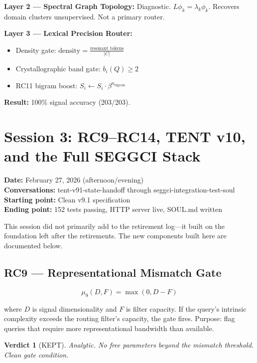 \documentclass[11pt]{article}
\newtheorem{verdict}{Verdict}
\begin{document}
\textbf{Layer 2 --- Spectral Graph Topology:} Diagnostic. $L\phi_k = \lambda_k\phi_k$. Recovers domain clusters unsupervised. Not a primary router.

\textbf{Layer 3 --- Lexical Precision Router:}
\begin{itemize}
  \item Density gate: $\text{density} = \frac{\text{resonant tokens}}{|C|}$
  \item Crystallographic band gate: $b_i(Q) \geq 2$
  \item RC11 bigram boost: $S_i \leftarrow S_i \cdot \beta^{n_{\text{bigram}}}$
\end{itemize}
\textbf{Result:} 100\% signal accuracy (203/203).

\section{Session 3: RC9--RC14, TENT v10, and the Full SEGGCI Stack}
\label{sec:session3}

\textbf{Date:} February 27, 2026 (afternoon/evening)\\
\textbf{Conversations:} tent-v91-state-handoff through seggci-integration-test-soul\\
\textbf{Starting point:} Clean v9.1 specification\\
\textbf{Ending point:} 152 tests passing, HTTP server live, SOUL.md written

This session did not primarily add to the retirement log---it built on the foundation left after the retirements. The new components built here are documented below.

\subsection{RC9 --- Representational Mismatch Gate}

\begin{equation}
  \mu_9(D, F) = \max(0, D - F)
\end{equation}

where $D$ is signal dimensionality and $F$ is filter capacity. If the query's intrinsic complexity exceeds the routing filter's capacity, the gate fires. Purpose: flag queries that require more representational bandwidth than available.

\begin{verdict}[\textcolor{keepgreen}{KEPT}]
Analytic. No free parameters beyond the mismatch threshold. Clean gate condition.
\end{verdict}
\end{document}
